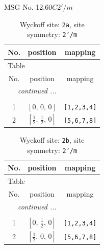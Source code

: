\documentclass[fleqn,8pt]{jsarticle}
\begin{document}
\setcounter{MaxMatrixCols}{32}

\renewcommand{\tablename}{Table~}
\renewcommand{\figurename}{Figure~}
\begin{center}
\LARGE
MSG No. 12.60\quad$C2'/m$
\end{center}
\renewcommand{\arraystretch}{1.2}
\begin{longtable}{ccc}
\caption{Wyckoff site: {\tt 2a}, site symmetry: {\tt 2'/m}}
 \\
 \hline \hline
No. & position & mapping \\ \hline \endfirsthead

\multicolumn{2}{l}{\tablename\ \thetable{}} \\
 \hline \hline
No. & position & mapping \\ \hline \endhead

 \hline \hline
\multicolumn{2}{r}{\footnotesize\it continued ...} \\ \endfoot

 \hline \hline
\multicolumn{2}{r}{} \\ \endlastfoot

1 & $\left[ 0,\, 0,\, 0 \right]$ & {\tt [1,2,3,4]} \\ \hline
2 & $\left[ \frac{1}{2},\, \frac{1}{2},\, 0 \right]$ & {\tt [5,6,7,8]} \\
\end{longtable}
\renewcommand{\arraystretch}{1.2}
\begin{longtable}{ccc}
\caption{Wyckoff site: {\tt 2b}, site symmetry: {\tt 2'/m}}
 \\
 \hline \hline
No. & position & mapping \\ \hline \endfirsthead

\multicolumn{2}{l}{\tablename\ \thetable{}} \\
 \hline \hline
No. & position & mapping \\ \hline \endhead

 \hline \hline
\multicolumn{2}{r}{\footnotesize\it continued ...} \\ \endfoot

 \hline \hline
\multicolumn{2}{r}{} \\ \endlastfoot

1 & $\left[ 0,\, \frac{1}{2},\, 0 \right]$ & {\tt [1,2,3,4]} \\ \hline
2 & $\left[ \frac{1}{2},\, 0,\, 0 \right]$ & {\tt [5,6,7,8]} \\
\end{longtable}
\renewcommand{\arraystretch}{1.2}
\end{document}
